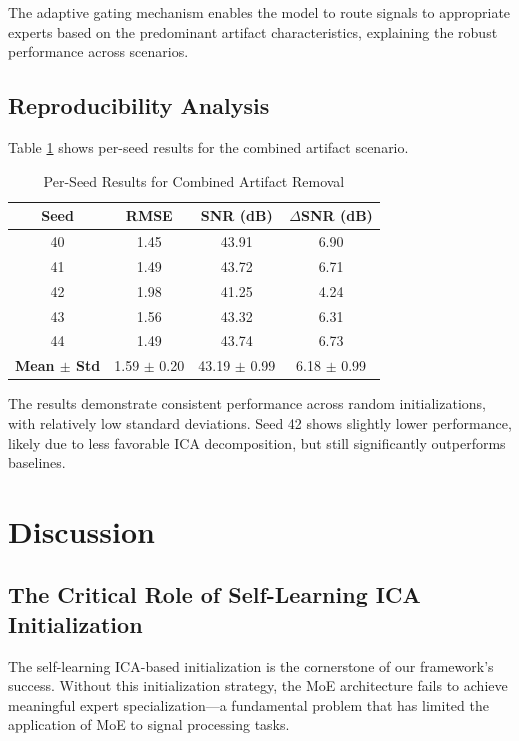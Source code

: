 \documentclass{article}
\begin{document}
The adaptive gating mechanism enables the model to route signals to appropriate experts based on the predominant artifact characteristics, explaining the robust performance across scenarios.

\subsection{Reproducibility Analysis}

Table \ref{tab:seeds} shows per-seed results for the combined artifact scenario.

\begin{table}[!t]
\centering
\caption{Per-Seed Results for Combined Artifact Removal}
\label{tab:seeds}
\begin{tabular}{cccc}
\toprule
\textbf{Seed} & \textbf{RMSE} & \textbf{SNR (dB)} & \textbf{$\Delta$SNR (dB)} \\
\midrule
40 & 1.45 & 43.91 & 6.90 \\
41 & 1.49 & 43.72 & 6.71 \\
42 & 1.98 & 41.25 & 4.24 \\
43 & 1.56 & 43.32 & 6.31 \\
44 & 1.49 & 43.74 & 6.73 \\
\midrule
\textbf{Mean $\pm$ Std} & 1.59 $\pm$ 0.20 & 43.19 $\pm$ 0.99 & 6.18 $\pm$ 0.99 \\
\bottomrule
\end{tabular}
\end{table}

The results demonstrate consistent performance across random initializations, with relatively low standard deviations. Seed 42 shows slightly lower performance, likely due to less favorable ICA decomposition, but still significantly outperforms baselines.




\section{Discussion}
\label{sec:discussion}

\subsection{The Critical Role of Self-Learning ICA Initialization}

The self-learning ICA-based initialization is the cornerstone of our framework's success. Without this initialization strategy, the MoE architecture fails to achieve meaningful expert specialization---a fundamental problem that has limited the application of MoE to signal processing tasks.
\end{document}
